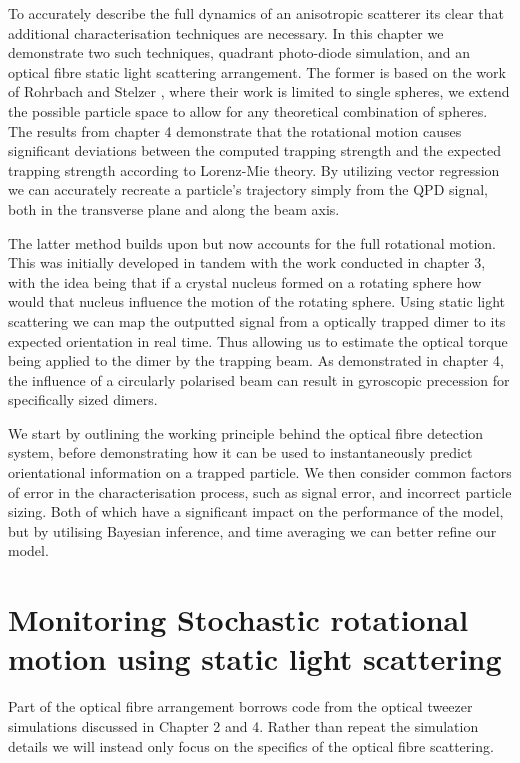 To accurately describe the full dynamics of an anisotropic
scatterer its clear that additional characterisation 
techniques are necessary. In this chapter we demonstrate 
two such techniques, quadrant photo-diode simulation, and 
an optical fibre static light scattering arrangement. The 
former is based on the work of Rohrbach and Stelzer 
\cite{Rohrbach2002}, where their work is limited to single 
spheres, we extend the possible particle space to allow for 
any theoretical combination of spheres. The results from
chapter 4 demonstrate that the rotational motion causes 
significant deviations between the computed trapping strength
and the expected trapping strength according to Lorenz-Mie
theory. By utilizing vector regression we can accurately 
recreate a particle's trajectory simply from the QPD signal, 
both in the transverse plane and along the beam axis. 

The latter method builds upon \cite{BarZiv1997} but now 
accounts for the full rotational motion. This was initially
developed in tandem with the work conducted in chapter 3,
with the idea being that if a crystal nucleus formed on a 
rotating sphere how would that nucleus influence the motion
of the rotating sphere. Using static light scattering we can 
map the outputted signal from a optically trapped dimer to 
its expected orientation in real time. Thus allowing us to 
estimate the optical torque being applied to the dimer by 
the trapping beam. As demonstrated in chapter 4, the 
influence of a circularly polarised beam can result in 
gyroscopic precession for specifically sized dimers. 

We start by outlining the working principle behind the
optical fibre detection system, before demonstrating 
how it can be used to instantaneously predict 
orientational information on a trapped particle. We then
consider common factors of error in the characterisation
process, such as signal error, and incorrect particle 
sizing. Both of which have a significant impact on the 
performance of the model, but by utilising Bayesian 
inference, and time averaging we can better refine our 
model.   

\section{Monitoring Stochastic rotational motion using static 
		light scattering}
Part of the optical fibre arrangement borrows code from the 
optical tweezer simulations discussed in Chapter 2 and 4. 
Rather than repeat the simulation details we will instead 
only focus on the specifics of the optical fibre scattering.


